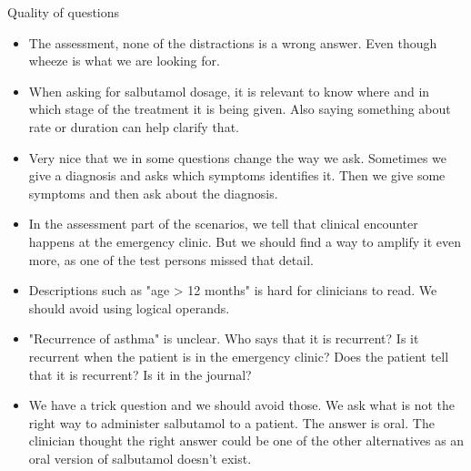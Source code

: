 Quality of questions
\begin{itemize}
	\item The assessment, none of the distractions is a wrong answer. Even though wheeze is what we are looking for.
	\item When asking for salbutamol dosage, it is relevant to know where and in which stage of the treatment it is being given. Also saying something about rate or duration can help clarify that.
	\item Very nice that we in some questions change the way we ask. Sometimes we give a diagnosis and asks which symptoms identifies it. Then we give some symptoms and then ask about the diagnosis.
	\item In the assessment part of the scenarios, we tell that clinical encounter happens at the emergency clinic. But we should find a way to amplify it even more, as one of the test persons missed that detail.
	\item Descriptions such as "age > 12 months" is hard for clinicians to read. We should avoid using logical operands.
	\item "Recurrence of asthma" is unclear. Who says that it is recurrent? Is it recurrent when the patient is in the emergency clinic? Does the patient tell that it is recurrent? Is it in the journal?
	\item We have a trick question and we should avoid those. We ask what is not the right way to administer salbutamol to a patient. The answer is oral. The clinician thought the right answer could be one of the other alternatives as an oral version of salbutamol doesn't exist.
\end{itemize}

